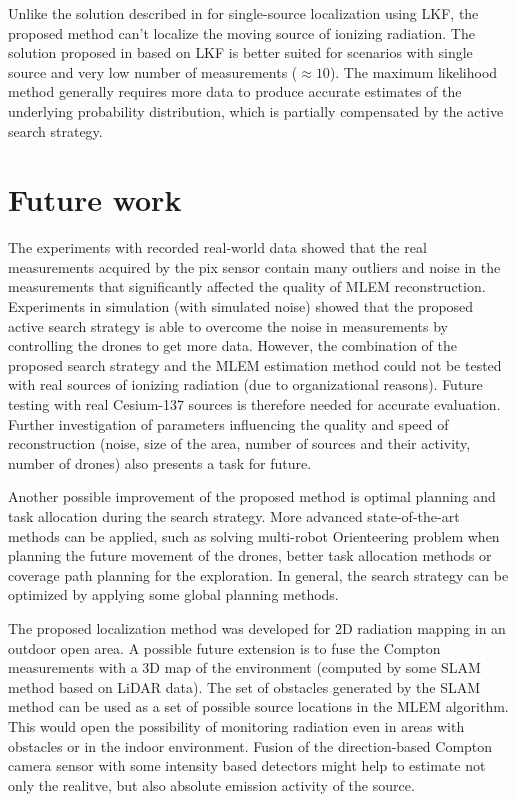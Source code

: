 Unlike the solution described in \cite{baca2021gamma} for single-source localization using \ac{LKF}, the proposed method can't localize the moving source of ionizing radiation.
The solution proposed in \cite{baca2021gamma} based on \ac{LKF} is better suited for scenarios with single source and very low number of measurements ($\approx 10$).
The maximum likelihood method generally requires more data to produce accurate estimates of the underlying probability distribution, which is partially compensated by the active search strategy.

\section{Future work}
The experiments with recorded real-world data showed that the real measurements acquired by the \ac{pix} sensor contain many outliers and noise in the measurements that significantly affected the quality of \ac{MLEM} reconstruction.
Experiments in simulation (with simulated noise) showed that the proposed active search strategy is able to overcome the noise in measurements by controlling the drones to get more data.
However, the combination of the proposed search strategy and the \ac{MLEM} estimation method could not be tested with real sources of ionizing radiation (due to organizational reasons).
Future testing with real Cesium-137 sources is therefore needed for accurate evaluation.
Further investigation of parameters influencing the quality and speed of reconstruction (noise, size of the area, number of sources and their activity, number of drones) also presents a task for future.

Another possible improvement of the proposed method is optimal planning and task allocation during the search strategy.
More advanced state-of-the-art methods can be applied, such as solving multi-robot Orienteering problem when planning the future movement of the drones, better task allocation methods or coverage path planning for the exploration.
In general, the search strategy can be optimized by applying some global planning methods.

The proposed localization method was developed for 2D radiation mapping in an outdoor open area.
A possible future extension is to fuse the Compton measurements with a 3D map of the environment (computed by some \ac{SLAM} method based on \ac{LiDAR} data).
The set of obstacles generated by the \ac{SLAM} method can be used as a set of possible source locations in the \ac{MLEM} algorithm.
This would open the possibility of monitoring radiation even in areas with obstacles or in the indoor environment.
Fusion of the direction-based Compton camera sensor with some intensity based detectors might help to estimate not only the realitve, but also absolute emission activity of the source. 

